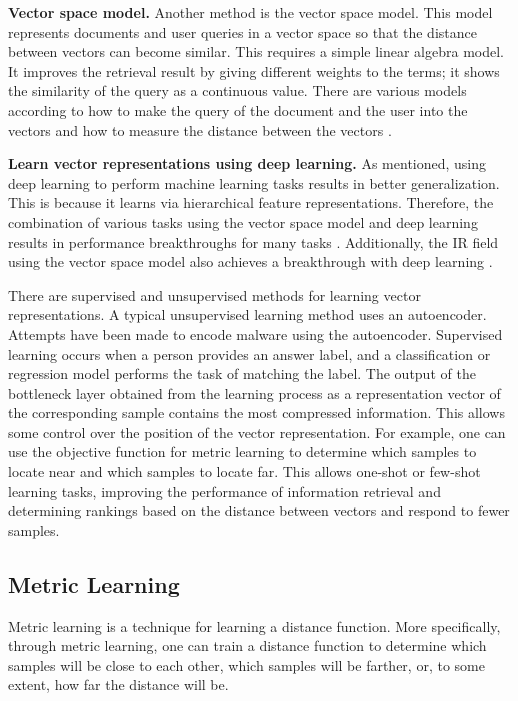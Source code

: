 \textbf{Vector space model.} Another method is the vector space model. This model represents documents and user queries in a vector space so that the distance between vectors can become similar. This requires a simple linear algebra model. It improves the retrieval result by giving different weights to the terms; it shows the similarity of the query as a continuous value. There are various models according to how to make the query of the document and the user into the vectors \cite{guo2016deep, liu2009learning} and how to measure the distance between the vectors \cite{diaz2016query, huang2013learning, roy2016using, mitra2016dual}.


\textbf{Learn vector representations using deep learning.} As mentioned, using deep learning to perform machine learning tasks results in better generalization. This is because it learns via hierarchical feature representations. Therefore, the combination of various tasks using the vector space model and deep learning results in performance breakthroughs for many tasks \cite{krizhevsky2012imagenet, mikolov2013efficient, hinton2012deep}. Additionally, the IR field using the vector space model also achieves a breakthrough with deep learning \cite{huang2013learning, severyn2015learning, wan2014deep}.


There are supervised and unsupervised methods for learning vector representations. A typical unsupervised learning method uses an autoencoder. Attempts have been made to encode malware using the autoencoder. Supervised learning occurs when a person provides an answer label, and a classification or regression model performs the task of matching the label. The output of the bottleneck layer obtained from the learning process as a representation vector of the corresponding sample contains the most compressed information. This allows some control over the position of the vector representation. For example, one can use the objective function for metric learning to determine which samples to locate near and which samples to locate far. This allows one-shot or few-shot learning tasks, improving the performance of information retrieval and determining rankings based on the distance between vectors and respond to fewer samples.


\subsection{Metric Learning}
Metric learning is a technique for learning a distance function. More specifically, through metric learning, one can train a distance function to determine which samples will be close to each other, which samples will be farther, or, to some extent, how far the distance will be.

